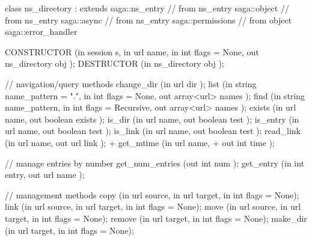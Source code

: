 \begin{myspec}
{ 
    class ns_directory : extends        saga::ns_entry
                         // from ns_entry  saga::object
                         // from ns_entry  saga::async
                         // from ns_entry  saga::permissions
                         // from object    saga::error_handler
    {
      CONSTRUCTOR        (in  session        s,
                          in  url            name,
                          in  int            flags = None,
                          out ns_directory   obj     );
      DESTRUCTOR         (in  ns_directory   obj     );
 
      // navigation/query methods
      change_dir         (in  url            dir     );
      list               (in  string         name_pattern = ".",
                          in  int            flags   = None, 
                          out array<url>     names   );
      find               (in  string         name_pattern,
                          in  int            flags = Recursive,
                          out array<url>     names   );
      exists             (in  url            name,
                          out boolean        exists  );
      is_dir             (in  url            name,
                          out boolean        test    );
      is_entry           (in  url            name,
                          out boolean        test    );
      is_link            (in  url            name,
                          out boolean        test    );
      read_link          (in  url            name,
                          out url            link    );
+     get_mtime          (in  url            name,
+                         out int            time    );
 
      // manage entries by number
      get_num_entries    (out int            num     );
      get_entry          (in  int            entry,
                          out url            name    );
 
      // management methods
      copy               (in  url            source,
                          in  url            target,
                          in  int            flags = None);
      link               (in  url            source,
                          in  url            target,
                          in  int            flags = None);
      move               (in  url            source,
                          in  url            target,
                          in  int            flags = None);
      remove             (in  url            target,
                          in  int            flags = None);
      make_dir           (in  url            target,
                          in  int            flags = None);
 
}}
\end{myspec}

